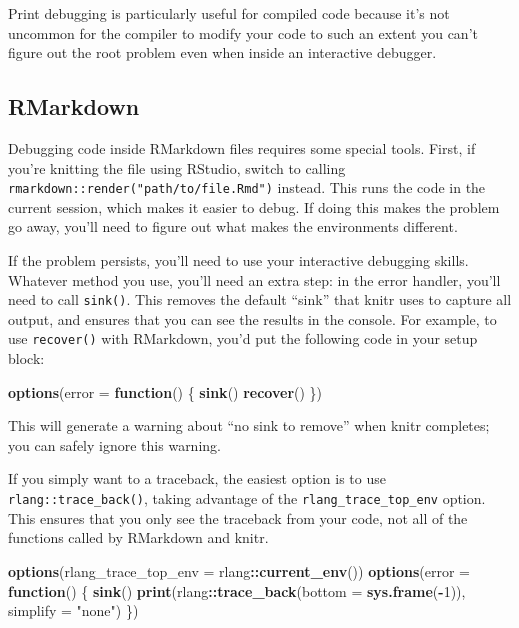 \documentclass[]{book}
\newenvironment{Shaded}{\begin{snugshade}}{\end{snugshade}}
\newcommand{\ControlFlowTok}[1]{\textcolor[rgb]{0.27,0.27,0.27}{\textbf{#1}}}
\newcommand{\DataTypeTok}[1]{\textcolor[rgb]{0.27,0.27,0.27}{#1}}
\newcommand{\DecValTok}[1]{\textcolor[rgb]{0.06,0.06,0.06}{#1}}
\newcommand{\KeywordTok}[1]{\textcolor[rgb]{0.27,0.27,0.27}{\textbf{#1}}}
\newcommand{\NormalTok}[1]{#1}
\newcommand{\OperatorTok}[1]{\textcolor[rgb]{0.43,0.43,0.43}{\textbf{#1}}}
\newcommand{\StringTok}[1]{\textcolor[rgb]{0.5,0.5,0.5}{#1}}
\begin{document}
Print debugging is particularly useful for compiled code because it's not uncommon for the compiler to modify your code to such an extent you can't figure out the root problem even when inside an interactive debugger.

\hypertarget{rmarkdown}{%
\subsection{RMarkdown}\label{rmarkdown}}


Debugging code inside RMarkdown files requires some special tools. First, if you're knitting the file using RStudio, switch to calling \texttt{rmarkdown::render("path/to/file.Rmd")} instead. This runs the code in the current session, which makes it easier to debug. If doing this makes the problem go away, you'll need to figure out what makes the environments different.

If the problem persists, you'll need to use your interactive debugging skills. Whatever method you use, you'll need an extra step: in the error handler, you'll need to call \texttt{sink()}. This removes the default ``sink'' that knitr uses to capture all output, and ensures that you can see the results in the console. For example, to use \texttt{recover()} with RMarkdown, you'd put the following code in your setup block:

\begin{Shaded}
\begin{Highlighting}[]
\KeywordTok{options}\NormalTok{(}\DataTypeTok{error =} \ControlFlowTok{function}\NormalTok{() \{}
  \KeywordTok{sink}\NormalTok{()}
  \KeywordTok{recover}\NormalTok{()}
\NormalTok{\})}
\end{Highlighting}
\end{Shaded}

This will generate a warning about ``no sink to remove'' when knitr completes; you can safely ignore this warning.

If you simply want to a traceback, the easiest option is to use \texttt{rlang::trace\_back()}, taking advantage of the \texttt{rlang\_trace\_top\_env} option. This ensures that you only see the traceback from your code, not all of the functions called by RMarkdown and knitr.

\begin{Shaded}
\begin{Highlighting}[]
\KeywordTok{options}\NormalTok{(}\DataTypeTok{rlang_trace_top_env =}\NormalTok{ rlang}\OperatorTok{::}\KeywordTok{current_env}\NormalTok{())}
\KeywordTok{options}\NormalTok{(}\DataTypeTok{error =} \ControlFlowTok{function}\NormalTok{() \{}
  \KeywordTok{sink}\NormalTok{()}
  \KeywordTok{print}\NormalTok{(rlang}\OperatorTok{::}\KeywordTok{trace_back}\NormalTok{(}\DataTypeTok{bottom =} \KeywordTok{sys.frame}\NormalTok{(}\OperatorTok{-}\DecValTok{1}\NormalTok{)), }\DataTypeTok{simplify =} \StringTok{"none"}\NormalTok{)}
\NormalTok{\})}
\end{Highlighting}
\end{Shaded}
\end{document}
